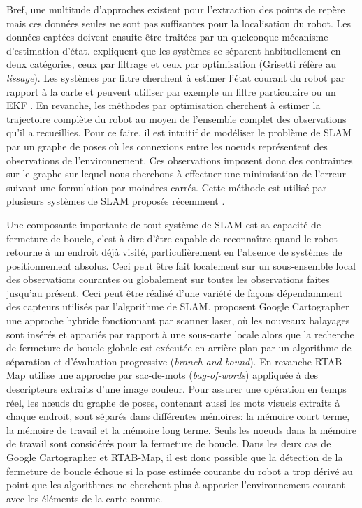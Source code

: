 Bref, une multitude d'approches existent pour l'extraction des points de repère mais ces données seules ne sont pas suffisantes pour la localisation du robot. Les données captées doivent ensuite être traitées par un quelconque mécanisme d'estimation d'état. \cite{Grisetti2010} expliquent que les systèmes se séparent habituellement en deux catégories, ceux par filtrage et ceux par optimisation (Grisetti réfère au \textit{lissage}). Les systèmes par filtre cherchent à estimer l'état courant du robot par rapport à la carte et peuvent utiliser par exemple un filtre particulaire \citep{Grisetti2007} ou un EKF \citep{Montemerlo03a}. En revanche, les méthodes par optimisation cherchent à estimer la trajectoire complète du robot au moyen de l'ensemble complet des observations qu'il a recueillies. Pour ce faire, il est intuitif de modéliser le problème de SLAM par un graphe de poses où les connexions entre les noeuds représentent des observations de l'environnement. Ces observations imposent donc des contraintes sur le graphe sur lequel nous cherchons à effectuer une minimisation de l'erreur suivant une formulation par moindres carrés. Cette méthode est utilisé par plusieurs systèmes de SLAM proposés récemment \citep{Labbe2014, Hess2016}.

Une composante importante de tout système de SLAM est sa capacité de fermeture de boucle, c'est-à-dire d'être capable de reconnaître quand le robot retourne à un endroit déjà visité, particulièrement en l'absence de systèmes de positionnement absolus. Ceci peut être fait localement sur un sous-ensemble local des observations courantes ou globalement sur toutes les observations faites jusqu'au présent. Ceci peut être réalisé d'une variété de façons dépendamment des capteurs utilisés par l'algorithme de SLAM. \cite{Hess2016} proposent Google Cartographer une approche hybride fonctionnant par scanner laser, où les nouveaux balayages sont insérés et appariés par rapport à une sous-carte locale alors que la recherche de fermeture de boucle globale est exécutée en arrière-plan par un algorithme de séparation et d'évaluation progressive (\textit{branch-and-bound}). En revanche RTAB-Map \citep{Labbe2014} utilise une approche par sac-de-mots (\textit{bag-of-words}) appliquée à des descripteurs extraits d'une image couleur. Pour assurer une opération en temps réel, les n\oe uds du graphe de poses, contenant aussi les mots visuels extraits à chaque endroit, sont séparés dans différentes mémoires: la mémoire court terme, la mémoire de travail et la mémoire long terme. Seuls les noeuds dans la mémoire de travail sont considérés pour la fermeture de boucle. Dans les deux cas de Google Cartographer et RTAB-Map, il est donc possible que la détection de la fermeture de boucle échoue si la pose estimée courante du robot a trop dérivé au point que les algorithmes ne cherchent plus à apparier l'environnement courant avec les éléments de la carte connue.

